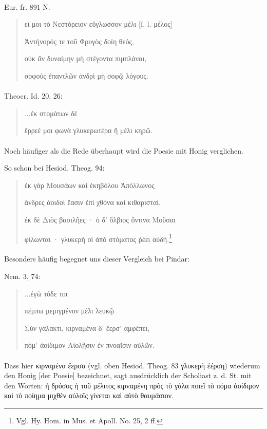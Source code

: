 \documentclass[a4paper, 11pt, oneside]{article}
\begin{document}
\paragraph{}
Eur. fr. 891 N.
\begin{quotation}
εἴ μοι τὸ Νεστόρειον εὔγλωσσον μέλι [f. l. μέλος]

Ἀντήνορός τε τοῦ Φρυγὸς δοίη θεός,

οὐκ ἂν δυναίμην μὴ στέγοντα πιμπλάναι,

σοφοὺς ἐπαντλῶν ἀνδρὶ μὴ σοφῷ λόγους.
\end{quotation}
\paragraph{}
Theocr. Id. 20, 26:
\begin{quotation}
\hspace*{15mm}...ἐκ στομάτων δέ

ἔρρεέ μοι φωνὰ γλυκερωτέρα ἢ μέλι κηρῶ.
\end{quotation}
\paragraph{}
Noch häufiger als die Rede überhaupt wird die Poesie mit Honig verglichen.

So schon bei Hesiod. Theog. 94:
\begin{quotation}
ἐκ γὰρ Μουσάων καὶ ἑκηβόλου Ἀπόλλωνος

ἄνδρες ἀοιδοὶ ἔασιν ἐπὶ χθόνα καὶ κιθαρισταί.

ἐκ δὲ Διὸς βασιλῆες · ὁ δ' ὄλβιος ὄντινα Μοῦσαι

φίλωνται · γλυκερή οἱ ἀπὸ στόματος ῥέει αὐδή.\footnote{Vgl. Hy. Hom. in Mus. et Apoll. No. 25, 2 ff.}
\end{quotation}
\paragraph{}
Besonders häufig begegnet uns dieser Vergleich bei Pindar:

Nem. 3, 74:
\begin{quotation}
\hspace*{15mm}...ἐγὼ τόδε τοι

πέμπω μεμιγμένον μέλι λευκῷ

Σὺν γάλακτι, κιρναμένα δ' ἔερσ' ἀμφέπει,

πόμ' ἀοίδιμον Αἰολῇσιν ἐν πνοαῖσιν αὐλῶν.
\end{quotation}
\paragraph{}
Dass hier κιρναμένα ἔερσα (vgl. oben Hesiod. Theog. 83 γλυκερὴ ἐέρση) wiederum den Honig [der Poesie] bezeichnet, sagt ausdrücklich der Scholiast z. d. St. mit den Worten: ἡ δρόσος ἡ τοῦ μέλιτος κιρναμένη πρὸς τὸ γάλα ποιεῖ τὸ πόμα ἀοίδιμον καὶ τὸ ποίημα μιχθὲν αὐλοῖς γίνεται καὶ αὐτὸ θαυμάσιον.
\end{document}

